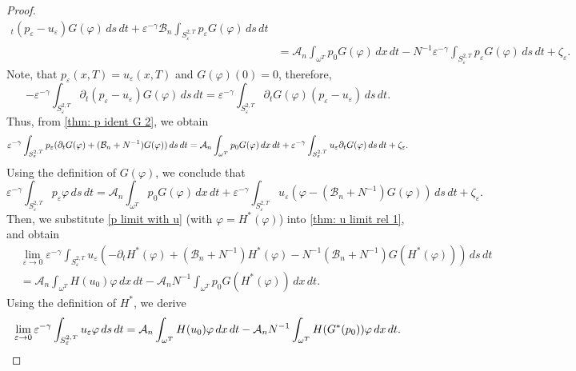 \documentclass[10pt,a4paper]{amsart}
\numberwithin{equation}{section}
\begin{document}
\begin{proof}
\begin{equation}
\begin{aligned}
_{t}(p_{\varepsilon }-u_{\varepsilon })G(\varphi )\,ds\,dt+\varepsilon
^{-\gamma }\mathcal{B}_n\int _{S_{\varepsilon }^{2,T}}p_{\varepsilon
}G(\varphi )\,ds\,dt    \\
&=\mathcal{A}_n\int _{\omega ^{T}}p_0G(\varphi )\,dx\,dt%
-N^{-1}\varepsilon ^{-\gamma }\int _{S_{\varepsilon
}^{2,T}}p_{\varepsilon }G(\varphi )\,ds\,dt+\zeta _{\varepsilon }.
\end{aligned} \label{thm: p ident G 2}
\end{equation}
Note, that $p_{\varepsilon }(x,T)=u_{\varepsilon }(x,T)$ and
$G(\varphi)(0)=0$, therefore,
\[
-\varepsilon ^{-\gamma }\int _{S_{\varepsilon }^{2,T}}\partial
_{t}(p_{\varepsilon }-u_{\varepsilon })G(\varphi )\,ds\,dt=\varepsilon
^{-\gamma }\int _{S_{\varepsilon }^{2,T}}\partial _{t}G(\varphi
)(p_{\varepsilon }-u_{\varepsilon })\,ds\,dt.
\]%
Thus, from \eqref{thm: p ident G 2}, we obtain
\[
\varepsilon ^{-\gamma }\int _{S_{\varepsilon }^{2,T}}p_{\varepsilon
}(\partial _{t}G(\varphi )+(\mathcal{B}_n+N^{-1})G(\varphi ))\,ds\,dt \\
=\mathcal{A}_n\int _{\omega ^{T}}p_0G(\varphi )\,dx\,dt+\varepsilon
^{-\gamma }\int _{S_{\varepsilon }^{2,T}}u_{\varepsilon }\partial
_{t}G(\varphi )\,ds\,dt+\zeta _{\varepsilon }.
\]
Using the definition of $G(\varphi )$, we conclude that
\begin{equation}
\varepsilon ^{-\gamma }\int _{S_{\varepsilon }^{2,T}}p_{\varepsilon
}\varphi \,ds\,dt=\mathcal{A}_n\int _{\omega ^{T}}p_0G(\varphi ){\,dx\,dt%
}+\varepsilon ^{-\gamma }\int _{S_{\varepsilon }^{2,T}}u_{\varepsilon
}(\varphi -(\mathcal{B}_n+N^{-1})G(\varphi ))\,ds\,dt+\zeta _{\varepsilon }.
\label{p limit with u}
\end{equation}
Then, we substitute \eqref{p limit with u} (with
$\varphi =H^{\ast }(\varphi)$) into \eqref{thm: u limit rel 1}, and obtain
\begin{align*}
&\lim _{\varepsilon \to 0}\varepsilon ^{-\gamma
}\int _{S_{\varepsilon }^{2,T}}u_{\varepsilon }(-\partial _{t}H^{\ast
}(\varphi )+(\mathcal{B}_n+N^{-1})H^{\ast }(\varphi )-N^{-1}(\mathcal{B}%
_n+N^{-1})G(H^{\ast }(\varphi )))\,ds\,dt \\
&=\mathcal{A}_n\int _{\omega ^{T}}H(u_0)\varphi \,dx\,dt-\mathcal{A}%
_nN^{-1}\int _{\omega ^{T}}p_0G(H^{\ast }(\varphi ))\,dx\,dt.
\end{align*}
Using the definition of $H^{\ast }$, we derive
\begin{equation}
\lim _{\varepsilon \to 0}\varepsilon ^{-\gamma
}\int _{S_{\varepsilon }^{2,T}}u_{\varepsilon }\varphi \,ds\,dt=\mathcal{%
A}_n\int _{\omega ^{T}}H(u_0)\varphi \,dx\,dt-\mathcal{A}%
_nN^{-1}\int _{\omega ^{T}}H(G^{\ast }(p_0))\varphi \,dx\,dt.
\label{thm: u limit rel}
\end{equation}


\end{proof}
\end{document}
